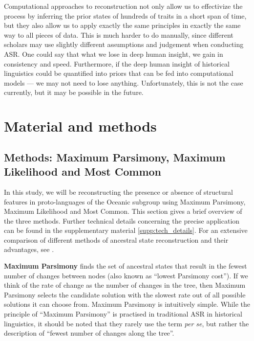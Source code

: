 \documentclass[12pt,letterpaper]{article}
\begin{document}

Computational approaches to reconstruction not only allow us to effectivize the process by inferring the prior states of hundreds of traits in a short span of time, but they also allow us to apply exactly the same principles in exactly the same way to all pieces of data. This is much harder to do manually, since different scholars may use slightly different assumptions and judgement when conducting ASR. One could say that what we lose in deep human insight, we gain in consistency and speed. Furthermore, if the deep human insight of historical linguistics could be quantified into priors that can be fed into computational models --- we may not need to lose anything. Unfortunately, this is not the case currently, but it may be possible in the future.


\FloatBarrier
\section{Material and methods}
\subsection{Methods: Maximum Parsimony, Maximum Likelihood and Most Common}
\label{sec:MP_ML_MC}
In this study, we will be reconstructing the presence or absence of structural features in proto-languages of the Oceanic subgroup using Maximum Parsimony, Maximum Likelihood and Most Common. This section gives a brief overview of the three methods. Further technical details concerning the precise application can be found in the supplementary material \ref{supp:tech_details}. For an extensive comparison of different methods of ancestral state reconstruction and their advantages, see \citet{joy2016ancestral}.

\textbf{Maximum Parsimony} finds the set of ancestral states that result in the fewest number of changes between nodes (also known as ``lowest Parsimony cost''). If we think of the rate of change as the number of changes in the tree, then Maximum Parsimony selects the candidate solution with the slowest rate out of all possible solutions it can choose from. Maximum Parsimony is intuitively simple. While the principle of ``Maximum Parsimony'' is practised in traditional ASR in historical linguistics, it should be noted that they rarely use the term \emph{per se}, but rather the description of ``fewest number of changes along the tree''.
\end{document}
